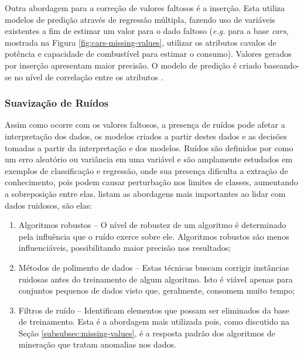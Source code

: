 Outra abordagem para a correção de valores faltosos é a inserção. Esta utiliza modelos de predição através de regressão múltipla, fazendo uso de variáveis existentes a fim de estimar um valor para o dado faltoso (\textit{e.g.} para a base \textit{cars}, mostrada na Figura \ref{fig:cars-missing-values}, utilizar os atributos cavalos de potência e capacidade de combustível para estimar o consumo). Valores gerados por inserção apresentam maior precisão. O modelo de predição é criado baseando\hyp{}se no nível de correlação entre os atributos \cite{larose2014discovering, osborne2012best, refaat2010data}.

\subsubsection{Suavização de Ruídos}
\label{subsubsec:noise}

Assim como ocorre com os valores faltosos, a presença de ruídos pode afetar a interpretação dos dados, os modelos criados a partir destes dados e as decisões tomadas a partir da interpretação e dos modelos. Ruídos são definidos por  como um erro aleatório ou variância em uma variável e são amplamente estudados em exemplos de classificação e regressão, onde sua presença dificulta a extração de conhecimento, pois podem causar perturbação nos limites de classes, aumentando a sobreposição entre elas.  listam as abordagens mais importantes ao lidar com dados ruidosos, são elas:

\begin{enumerate}[label=\roman*.]
    \item Algoritmos robustos {--} O nível de robustez de um algoritmo é determinado pela influência que o ruído exerce sobre ele. Algoritmos robustos são menos influenciáveis, possibilitando maior precisão nos resultados;
    \item Métodos de polimento de dados {--} Estas técnicas buscam corrigir instâncias ruidosas antes do treinamento de algum algoritmo. Isto é viável apenas para conjuntos pequenos de dados visto que, geralmente, consomem muito tempo;
    \item Filtros de ruído {--} Identificam elementos que possam ser eliminados da base de treinamento. Esta é a abordagem mais utilizada pois, como discutido na Seção \ref{subsubsec:missing-values}, é a resposta padrão dos algoritmos de mineração que tratam anomalias nos dados.
\end{enumerate}

